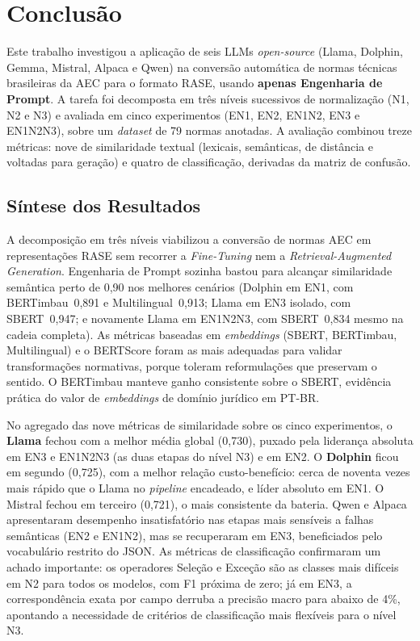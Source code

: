 \documentclass[a4paper,fleqn]{cas-sc}
\begin{document}
\section{Conclusão}\label{sec:conclusao}

Este trabalho investigou a aplicação de seis LLMs \textit{open-source} (Llama, Dolphin, Gemma, Mistral, Alpaca e Qwen) na conversão automática de normas técnicas brasileiras da AEC para o formato RASE, usando \textbf{apenas Engenharia de Prompt}. A tarefa foi decomposta em três níveis sucessivos de normalização (N1, N2 e N3) e avaliada em cinco experimentos (EN1, EN2, EN1N2, EN3 e EN1N2N3), sobre um \textit{dataset} de 79 normas anotadas. A avaliação combinou treze métricas: nove de similaridade textual (lexicais, semânticas, de distância e voltadas para geração) e quatro de classificação, derivadas da matriz de confusão.

\subsection{Síntese dos Resultados}

A decomposição em três níveis viabilizou a conversão de normas AEC em representações RASE sem recorrer a \textit{Fine-Tuning} nem a \textit{Retrieval-Augmented Generation}. Engenharia de Prompt sozinha bastou para alcançar similaridade semântica perto de 0{,}90 nos melhores cenários (Dolphin em EN1, com BERTimbau~0{,}891 e Multilingual~0{,}913; Llama em EN3 isolado, com SBERT~0{,}947; e novamente Llama em EN1N2N3, com SBERT~0{,}834 mesmo na cadeia completa). As métricas baseadas em \textit{embeddings} (SBERT, BERTimbau, Multilingual) e o BERTScore foram as mais adequadas para validar transformações normativas, porque toleram reformulações que preservam o sentido. O BERTimbau manteve ganho consistente sobre o SBERT, evidência prática do valor de \textit{embeddings} de domínio jurídico em PT-BR.

No agregado das nove métricas de similaridade sobre os cinco experimentos, o \textbf{Llama} fechou com a melhor média global (0{,}730), puxado pela liderança absoluta em EN3 e EN1N2N3 (as duas etapas do nível N3) e em EN2. O \textbf{Dolphin} ficou em segundo (0{,}725), com a melhor relação custo-benefício: cerca de noventa vezes mais rápido que o Llama no \textit{pipeline} encadeado, e líder absoluto em EN1. O Mistral fechou em terceiro (0{,}721), o mais consistente da bateria. Qwen e Alpaca apresentaram desempenho insatisfatório nas etapas mais sensíveis a falhas semânticas (EN2 e EN1N2), mas se recuperaram em EN3, beneficiados pelo vocabulário restrito do JSON. As métricas de classificação confirmaram um achado importante: os operadores Seleção e Exceção são as classes mais difíceis em N2 para todos os modelos, com F1 próxima de zero; já em EN3, a correspondência exata por campo derruba a precisão macro para abaixo de 4\%, apontando a necessidade de critérios de classificação mais flexíveis para o nível N3.
\end{document}
